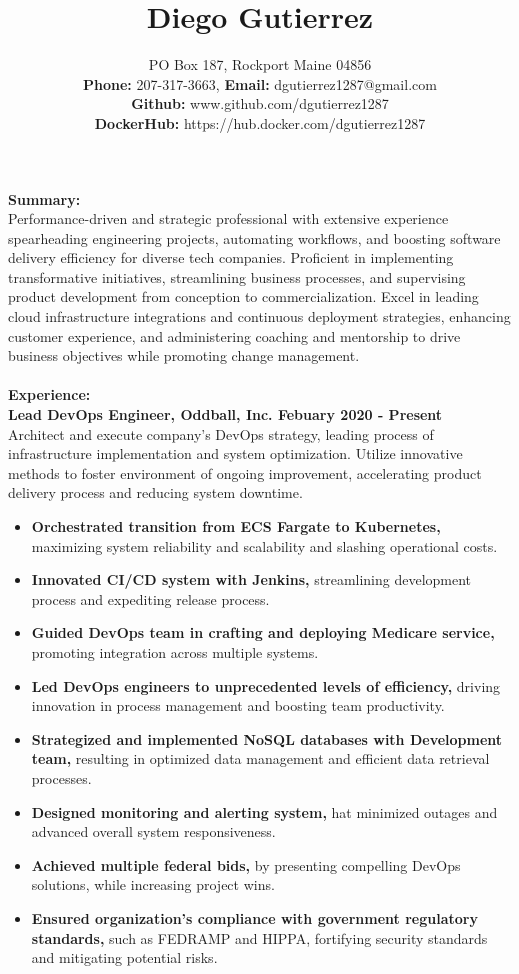 \documentclass[10pt]{article}
\title{Diego Gutierrez}
\date{}
\author{%
	PO Box 187, Rockport Maine 04856\\
	\textbf{Phone:} 207-317-3663, \textbf{Email:} dgutierrez1287@gmail.com\\
	\textbf{Github:} www.github.com/dgutierrez1287\\
	\textbf{DockerHub:} https://hub.docker.com/dgutierrez1287
}
\makeatletter
\renewcommand{\maketitle}{\bgroup\setlength{\parindent}{0pt}
	\begin{flushleft}
		\LARGE\textbf{\@title}
		
		\normalsize\@author
	\end{flushleft}\egroup
}
\makeatother
\begin{document}
\maketitle
\thispagestyle{empty} %
\noindent\Large\textbf{Summary:}\\
\normalsize Performance-driven and strategic professional with extensive experience spearheading engineering projects, 
automating workflows, and boosting software delivery efficiency for diverse tech companies. Proficient in implementing transformative initiatives, 
streamlining business processes, and supervising product development from conception to commercialization. Excel in leading cloud infrastructure 
integrations and continuous deployment strategies, enhancing customer experience, and administering coaching and mentorship to drive business 
objectives while promoting change management.
\\
\\
\noindent\Large\textbf{Experience:}\\
\normalsize
\textbf{Lead DevOps Engineer, Oddball, Inc. \hfill{Febuary 2020 - Present}}\\
\normalsize Architect and execute company's DevOps strategy, leading process of infrastructure implementation and system optimization. 
Utilize innovative methods to foster environment of ongoing improvement, accelerating product delivery process and reducing system downtime.
\begin{itemize}
\small
\item \textbf{Orchestrated transition from ECS Fargate to Kubernetes,} maximizing system reliability and scalability and slashing operational costs.
\item \textbf{Innovated CI/CD system with Jenkins,} streamlining development process and expediting release process.
\item \textbf{Guided DevOps team in crafting and deploying Medicare service,} promoting integration across multiple systems.
\item \textbf{Led DevOps engineers to unprecedented levels of efficiency,} driving innovation in process management and boosting
team productivity. 
\item \textbf{Strategized and implemented NoSQL databases with Development team,} resulting in optimized data management and
efficient data retrieval processes.
\item \textbf{Designed monitoring and alerting system,} hat minimized outages and advanced overall system responsiveness.
\item \textbf{Achieved multiple federal bids,} by presenting compelling DevOps solutions, while increasing project wins.
\item \textbf{Ensured organization's compliance with government regulatory standards,} such as FEDRAMP and HIPPA, fortifying
security standards and mitigating potential risks.
\end{itemize}
\end{document}
